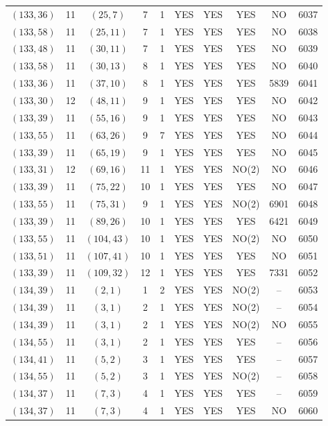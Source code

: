 \begin{longtable}{|c|c|c|c|c|c|c|c|c|c|}
$(133, 36)$ & 11 & $(25, 7)$ & 7 & 1 & YES & YES & YES & NO & 6037\\
$(133, 58)$ & 11 & $(25, 11)$ & 7 & 1 & YES & YES & YES & NO & 6038\\
$(133, 48)$ & 11 & $(30, 11)$ & 7 & 1 & YES & YES & YES & NO & 6039\\
$(133, 58)$ & 11 & $(30, 13)$ & 8 & 1 & YES & YES & YES & NO & 6040\\
$(133, 36)$ & 11 & $(37, 10)$ & 8 & 1 & YES & YES & YES & 5839 & 6041\\
$(133, 30)$ & 12 & $(48, 11)$ & 9 & 1 & YES & YES & YES & NO & 6042\\
$(133, 39)$ & 11 & $(55, 16)$ & 9 & 1 & YES & YES & YES & NO & 6043\\
$(133, 55)$ & 11 & $(63, 26)$ & 9 & 7 & YES & YES & YES & NO & 6044\\
$(133, 39)$ & 11 & $(65, 19)$ & 9 & 1 & YES & YES & YES & NO & 6045\\
$(133, 31)$ & 12 & $(69, 16)$ & 11 & 1 & YES & YES & NO(2) & NO & 6046\\
$(133, 39)$ & 11 & $(75, 22)$ & 10 & 1 & YES & YES & YES & NO & 6047\\
$(133, 55)$ & 11 & $(75, 31)$ & 9 & 1 & YES & YES & NO(2) & 6901 & 6048\\
$(133, 39)$ & 11 & $(89, 26)$ & 10 & 1 & YES & YES & YES & 6421 & 6049\\
$(133, 55)$ & 11 & $(104, 43)$ & 10 & 1 & YES & YES & NO(2) & NO & 6050\\
$(133, 51)$ & 11 & $(107, 41)$ & 10 & 1 & YES & YES & YES & NO & 6051\\
$(133, 39)$ & 11 & $(109, 32)$ & 12 & 1 & YES & YES & YES & 7331 & 6052\\
$(134, 39)$ & 11 & $(2, 1)$ & 1 & 2 & YES & YES & NO(2) & -- & 6053\\
$(134, 39)$ & 11 & $(3, 1)$ & 2 & 1 & YES & YES & NO(2) & -- & 6054\\
$(134, 39)$ & 11 & $(3, 1)$ & 2 & 1 & YES & YES & NO(2) & NO & 6055\\
$(134, 55)$ & 11 & $(3, 1)$ & 2 & 1 & YES & YES & YES & -- & 6056\\
$(134, 41)$ & 11 & $(5, 2)$ & 3 & 1 & YES & YES & YES & -- & 6057\\
$(134, 55)$ & 11 & $(5, 2)$ & 3 & 1 & YES & YES & NO(2) & -- & 6058\\
$(134, 37)$ & 11 & $(7, 3)$ & 4 & 1 & YES & YES & YES & -- & 6059\\
$(134, 37)$ & 11 & $(7, 3)$ & 4 & 1 & YES & YES & YES & NO & 6060\\

\end{longtable}
